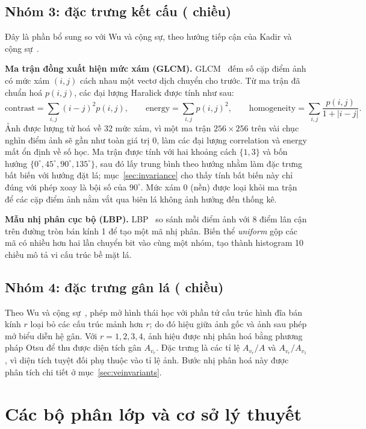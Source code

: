 \documentclass[11pt,a4paper]{article}
\begin{document}
\subsection{Nhóm 3: đặc trưng kết cấu (\texturedims{} chiều)}
\label{sec:texture}

Đây là phần bổ sung so với Wu và cộng sự, theo hướng tiếp cận của Kadir và cộng sự~\cite{kadir2011}.

\textbf{Ma trận đồng xuất hiện mức xám (GLCM).} GLCM~\cite{haralick1973} đếm số cặp điểm ảnh có mức
xám $(i,j)$ cách nhau một vectơ dịch chuyển cho trước. Từ ma trận đã chuẩn hoá $p(i,j)$, các đại
lượng Haralick được tính như sau:
\[
\text{contrast} = \sum_{i,j} (i-j)^2 p(i,j), \qquad
\text{energy} = \sum_{i,j} p(i,j)^2, \qquad
\text{homogeneity} = \sum_{i,j} \frac{p(i,j)}{1+|i-j|}.
\]
Ảnh được lượng tử hoá về 32 mức xám, vì một ma trận $256\times256$ trên vài chục nghìn điểm ảnh sẽ
gần như toàn giá trị 0, làm các đại lượng correlation và energy mất ổn định về số học. Ma trận được
tính với hai khoảng cách $\{1,3\}$ và bốn hướng $\{0^\circ,45^\circ,90^\circ,135^\circ\}$, sau đó lấy
trung bình theo hướng nhằm làm đặc trưng bất biến với hướng đặt lá; mục~\ref{sec:invariance} cho thấy
tính bất biến này chỉ đúng với phép xoay là bội số của $90^\circ$. Mức xám 0 (nền) được loại khỏi
ma trận để các cặp điểm ảnh nằm vắt qua biên lá không ảnh hưởng đến thống kê.

\textbf{Mẫu nhị phân cục bộ (LBP).} LBP~\cite{ojala2002} so sánh mỗi điểm ảnh với 8 điểm lân cận trên
đường tròn bán kính 1 để tạo một mã nhị phân. Biến thể \emph{uniform} gộp các mã có nhiều hơn hai lần
chuyển bit vào cùng một nhóm, tạo thành histogram 10 chiều mô tả vi cấu trúc bề mặt lá.

\subsection{Nhóm 4: đặc trưng gân lá (\veindims{} chiều)}

Theo Wu và cộng sự~\cite{wu2007}, phép mở hình thái học với phần tử cấu trúc hình đĩa bán kính $r$
loại bỏ các cấu trúc mảnh hơn $r$; do đó hiệu giữa ảnh gốc và ảnh sau phép mở biểu diễn hệ gân. Với
$r = 1,2,3,4$, ảnh hiệu được nhị phân hoá bằng phương pháp Otsu để thu được diện tích gân $A_{v_r}$.
Đặc trưng là các tỉ lệ $A_{v_r}/A$ và $A_{v_r}/A_{v_1}$, vì diện tích tuyệt đối phụ thuộc vào tỉ lệ
ảnh. Bước nhị phân hoá này được phân tích chi tiết ở mục~\ref{sec:veinvariants}.

\section{Các bộ phân lớp và cơ sở lý thuyết}
\end{document}
